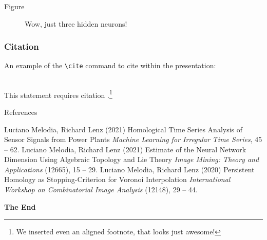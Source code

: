 \documentclass[aspectratio=169,xcolor=dvipsnames,12pt]{beamer}
\begin{document}
\begin{frame}{Figure}
    \begin{figure}
      
      \caption{Wow, just three hidden neurons!}
    \end{figure}
\end{frame}


\begin{frame}[fragile]
    \frametitle{Citation}
    An example of the \verb|\cite| command to cite within the presentation:\\~

    This statement requires citation \cite{p1}.\footnote{We inserted even an aligned footnote, that looks just awesome!}
\end{frame}


\begin{frame}{References}
    \footnotesize{
        \begin{thebibliography}{99}
           Luciano Melodia, Richard Lenz (2021)
          \newblock Homological Time Series Analysis of Sensor Signals from Power Plants
          \newblock \emph{Machine Learning for Irregular Time Series}, 45 -- 62.
           Luciano Melodia, Richard Lenz (2021)
          \newblock Estimate of the Neural Network Dimension Using Algebraic Topology and Lie Theory
          \newblock \emph{Image Mining: Theory and Applications} (12665), 15 -- 29.
           Luciano Melodia, Richard Lenz (2020)
          \newblock Persistent Homology as Stopping-Criterion for Voronoi Interpolation
          \newblock \emph{International Workshop on Combinatorial Image Analysis} (12148), 29 -- 44.
        \end{thebibliography}
    }
\end{frame}


\begin{frame}
    \Huge{\centerline{\textbf{The End}}}
\end{frame}
\end{document}
